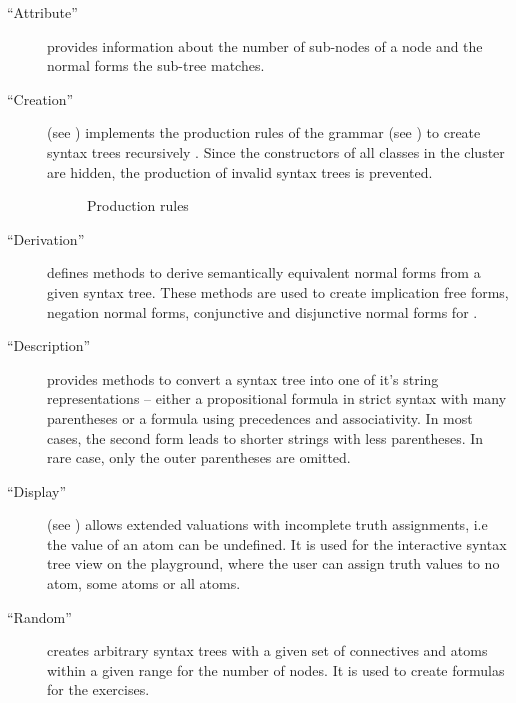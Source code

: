 \begin{description}

\item[“Attribute”] provides information about the number of sub-nodes of a node 
and the normal forms the sub-tree matches. 

\item[“Creation”] (see ) 
implements the production rules of the grammar (see )
to create syntax trees recursively .
Since the constructors of all classes in the cluster are hidden, 
the production of invalid syntax trees is prevented.

\begin{figure}[htbp]
\begin{center}
\caption{Production rules}
\label{fig:NyayaNodeCreation}
\end{center}
\end{figure}

\item[“Derivation”] defines methods to derive semantically equivalent normal forms from a given syntax tree.
These methods are used to create implication free forms, negation normal forms, conjunctive and disjunctive normal forms for \BoolTool.

\item[“Description”] provides methods to convert a syntax tree into one of it's string representations – 
either a propositional formula in strict syntax with many parentheses 
or a formula using precedences and associativity.
In most cases, the second form leads to shorter strings with less parentheses. 
In rare case, only the outer parentheses are omitted.

\item[“Display”] (see ) allows extended valuations
with incomplete truth assignments, i.e the value of an atom can be undefined.
It is used for the interactive syntax tree view on the playground, 
where the user can assign truth values to no atom, some atoms or all atoms.
% 


\item[“Random”] creates arbitrary syntax trees with a given set of connectives and atoms 
within a given range for the number of nodes. It is used to create formulas for the exercises.


\end{description}

